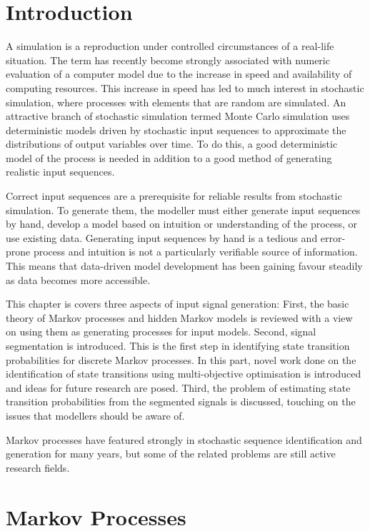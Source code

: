 \section{Introduction}
A simulation is a reproduction under controlled circumstances of a
real-life situation.  The term has recently become strongly associated
with numeric evaluation of a computer model due to the increase in
speed and availability of computing resources.  This increase in speed
has led to much interest in stochastic simulation, where processes
with elements that are random are simulated.  An attractive branch of
stochastic simulation termed Monte Carlo simulation uses deterministic
models driven by stochastic input sequences to approximate the
distributions of output variables over time.  To do this, a good
deterministic model of the process is needed in addition to a good
method of generating realistic input sequences.

Correct input sequences are a prerequisite for reliable results from
stochastic simulation.  To generate them, the modeller must either
generate input sequences by hand, develop a model based on intuition
or understanding of the process, or use existing data.  Generating
input sequences by hand is a tedious and error-prone process and
intuition is not a particularly verifiable source of information.
This means that data-driven model development has been gaining favour
steadily as data becomes more accessible.

This chapter is covers three aspects of input signal generation:
First, the basic theory of Markov processes and hidden Markov models
is reviewed with a view on using them as generating processes for
input models. Second, signal segmentation is introduced.  This is the
first step in identifying state transition probabilities for discrete
Markov processes.  In this part, novel work done on the identification
of state transitions using multi-objective optimisation is introduced
and ideas for future research are posed. Third, the problem of
estimating state transition probabilities from the segmented signals
is discussed, touching on the issues that modellers should be aware
of.

Markov processes have featured strongly in stochastic sequence
identification and generation for many years, but some of the related
problems are still active research fields.

\section{Markov Processes}
